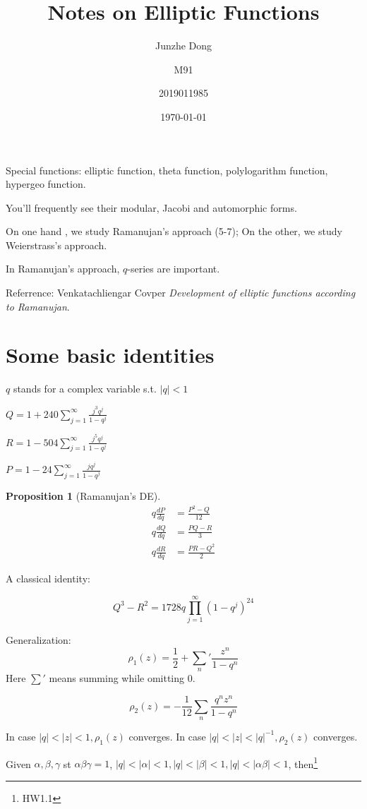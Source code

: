 \documentclass{article}
\title{Notes on Elliptic Functions}
\author{Junzhe Dong\and M91\and 2019011985}
\date{\today}
\newtheorem{Prop}[Thm]{Proposition}
\begin{document}
\maketitle

Special functions: elliptic function, theta function, polylogarithm function, hypergeo function.

You'll frequently see their modular, Jacobi and automorphic forms.

On one hand , we study Ramanujan's approach (5-7); On the other, we study Weierstrass's approach.

In Ramanujan's approach, $q$-series are important.

Referrence: Venkatachliengar Covper \textit{Development of elliptic functions according to Ramanujan}.

\section{Some basic identities}
$q$ stands for a complex variable s.t.  $|q|<1$

$Q= 1 + 240 \sum\limits_{j=1}^{\infty} \frac{j^3 q^j}{1-q^j}$

$R= 1 - 504 \sum\limits_{j=1}^{\infty} \frac{j^5q^j}{1- q^j}$

$P= 1 - 24 \sum\limits_{j=1}^{\infty}\frac{jq^j}{1-q^j}$

\begin{Prop}[Ramanujan's DE]
\begin{align*}
  q \frac{dP}{dq} &= \frac{P^2-Q}{12}\\
  q \frac{dQ}{dq} &=\frac{PQ-R}{3}\\
  q \frac{dR}{dq} &= \frac{PR-Q^2}{2}
\end{align*}

\end{Prop}

A classical identity:

\begin{equation}
\label{eq:0.id}
  Q^3-R^2=1728q\prod_{j=1}^{\infty}(1-q^j)^{24}
\end{equation}

Generalization:
\[\rho_1(z)= \frac{1}{2}+ \sum_n'\frac{z^n}{1-q^n}\] Here $\sum'$ means summing while omitting 0.

\[\rho_2(z)= -\frac{1}{12} \sum_n^{} \frac{q^nz^n}{1-q^n}\]

In case $|q|<|z|<1, \rho_1(z)$ converges. In case $|q|<|z|<|q|^{-1}, \rho_2(z)$ converges.

Given $\alpha, \beta,\gamma$ st $\alpha\beta\gamma=1$, $|q|<|\alpha|<1, |q|<|\beta|<1, |q|<|\alpha\beta|<1$, then\footnote{HW1.1}
\end{document}
